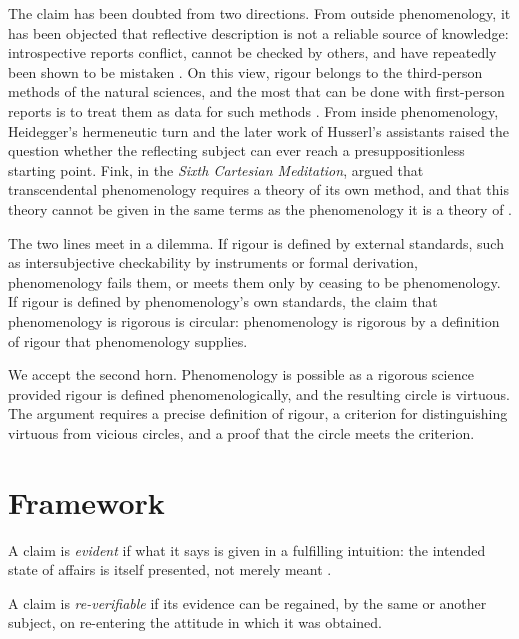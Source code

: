 \documentclass{situationist-preprint}
\begin{document}
The claim has been doubted from two directions. From outside phenomenology, it has been objected that reflective description is not a reliable source of knowledge: introspective reports conflict, cannot be checked by others, and have repeatedly been shown to be mistaken \citep{Schwitzgebel2008}. On this view, rigour belongs to the third-person methods of the natural sciences, and the most that can be done with first-person reports is to treat them as data for such methods \citep{Dennett2003}. From inside phenomenology, Heidegger's hermeneutic turn and the later work of Husserl's assistants raised the question whether the reflecting subject can ever reach a presuppositionless starting point. Fink, in the \emph{Sixth Cartesian Meditation}, argued that transcendental phenomenology requires a theory of its own method, and that this theory cannot be given in the same terms as the phenomenology it is a theory of \citep{Fink1995}.

The two lines meet in a dilemma. If rigour is defined by external standards, such as intersubjective checkability by instruments or formal derivation, phenomenology fails them, or meets them only by ceasing to be phenomenology. If rigour is defined by phenomenology's own standards, the claim that phenomenology is rigorous is circular: phenomenology is rigorous by a definition of rigour that phenomenology supplies.

We accept the second horn. Phenomenology is possible as a rigorous science provided rigour is defined phenomenologically, and the resulting circle is virtuous. The argument requires a precise definition of rigour, a criterion for distinguishing virtuous from vicious circles, and a proof that the circle meets the criterion.

\section{Framework}

\begin{definition}\label{d:evident}
A claim is \emph{evident} if what it says is given in a fulfilling intuition: the intended state of affairs is itself presented, not merely meant \citep[VI, §§36--39]{Husserl1901}.
\end{definition}

\begin{definition}\label{d:reverify}
A claim is \emph{re-verifiable} if its evidence can be regained, by the same or another subject, on re-entering the attitude in which it was obtained.
\end{definition}
\end{document}
